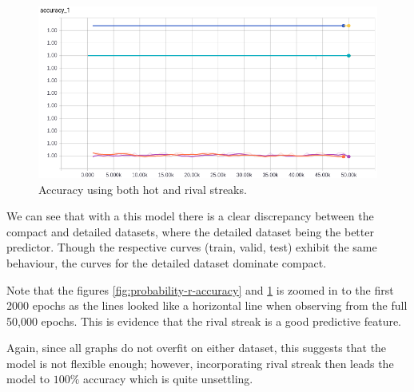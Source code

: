 \documentclass{article} %
\begin{document}
\begin{figure}[!htb]
\endminipage
{}%
  \includegraphics[width=\linewidth]{plots/model1/probability/streak-hr/accuracy.png}
  \caption{Accuracy using both hot and rival streaks.}\label{fig:probability-hr-accuracy}
\endminipage
\end{figure}

We can see that with a this model there is a clear discrepancy between the compact and detailed datasets, where the detailed dataset being the better predictor.
Though the respective curves (train, valid, test) exhibit the same behaviour, the curves for the detailed dataset dominate compact.

Note that the figures \ref{fig:probability-r-accuracy} and \ref{fig:probability-hr-accuracy} is zoomed in to the first 2000 epochs as the lines looked like a horizontal line when observing from the full 50,000 epochs.  This is evidence that the rival streak is a good predictive feature.

Again, since all graphs do not overfit on either dataset, this suggests that the model is not flexible enough; however, incorporating rival streak then leads the model to $100\%$ accuracy which is quite unsettling.
\end{document}
